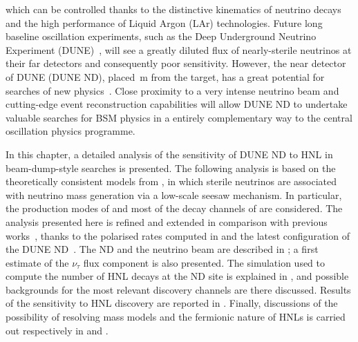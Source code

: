 which can be controlled thanks to the distinctive kinematics of neutrino decays and %
the high performance of Liquid Argon (LAr) technologies.
Future long baseline oscillation experiments, such as the Deep Underground Neutrino Experiment %
(DUNE)~\cite{Abi:2018dnh}, will see a greatly diluted flux of nearly-sterile neutrinos %
at their far detectors and consequently poor sensitivity.
However, the near detector of DUNE (DUNE ND), placed \,m from the target, has a great potential %
for searches of new physics~\cite{Adams:2013qkq}.
Close proximity to a very intense neutrino beam and cutting-edge event reconstruction capabilities %
will allow DUNE ND to undertake valuable searches for BSM physics in a entirely complementary way %
to the central oscillation physics programme. 

In this chapter, a detailed analysis of the sensitivity of DUNE ND to HNL in beam-dump-style searches is presented.
The following analysis is based on the theoretically consistent models from , %
in which sterile neutrinos are associated with neutrino mass generation via a low-scale seesaw mechanism.
In particular, the production modes of  and most of the decay channels of  %
are considered.
The analysis presented here is refined and extended in comparison with previous works~\cite{Krasnov:2019kdc, Adams:2013qkq}, %
thanks to the polarised rates computed in  and the latest configuration of the DUNE ND~\cite{Abi:2020wmh}.
The ND and the neutrino beam are described in ; %
a first estimate of the $\nu_\tau$ flux component is also presented.
The simulation used to compute the number of HNL decays at the ND site is explained in , %
and possible backgrounds for the most relevant discovery channels are there discussed.
Results of the sensitivity to HNL discovery are reported in .
Finally, discussions of the possibility of resolving mass models and the fermionic nature of HNLs is %
carried out respectively in  and .

